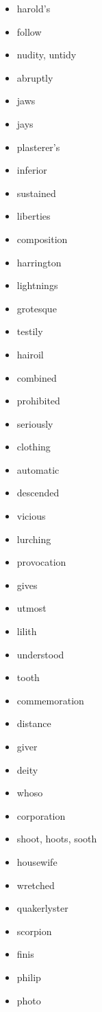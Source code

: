\documentclass{article}
\begin{document}
\begin{itemize}
    \item harold's
    \item follow
    \item nudity, untidy
    \item abruptly
    \item jaws
    \item jays
    \item plasterer's
    \item inferior
    \item sustained
    \item liberties
    \item composition
    \item harrington
    \item lightnings
    \item grotesque
    \item testily
    \item hairoil
    \item combined
    \item prohibited
    \item seriously
    \item clothing
    \item automatic
    \item descended
    \item vicious
    \item lurching
    \item provocation
    \item gives
    \item utmost
    \item lilith
    \item understood
    \item tooth
    \item commemoration
    \item distance
    \item giver
    \item deity
    \item whoso
    \item corporation
    \item shoot, hoots, sooth
    \item housewife
    \item wretched
    \item quakerlyster
    \item scorpion
    \item finis
    \item philip
    \item photo

\end{itemize}
\end{document}
